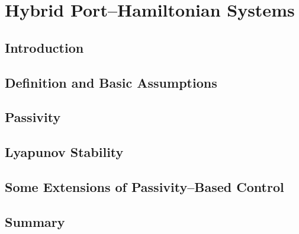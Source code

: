 \chapter{Hybrid Port--Hamiltonian Systems}

\label{chap:HPH_systems}
\minitoc

\thispagestyle{empty}

\newpage

\section{Introduction}


\section{Definition and Basic Assumptions}


\section{Passivity}

\section{Lyapunov Stability}


\section{Some Extensions of Passivity--Based Control}


\section{Summary}